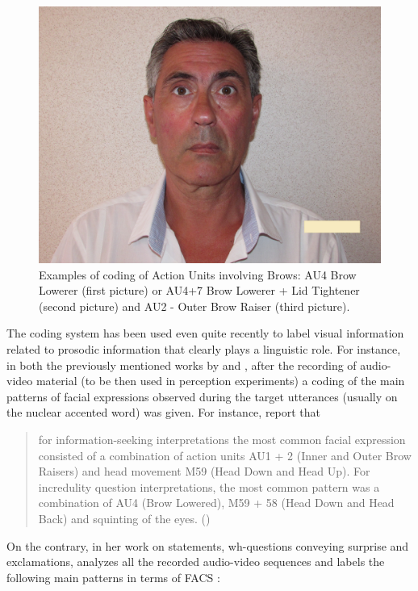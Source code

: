 \documentclass[output=paper]{langsci/langscibook}
\begin{document}
\begin{figure}
\includegraphics[height=.3\textheight]{figures/GIL-img8.jpg}
\caption{Examples of coding of Action Units involving Brows: AU4 \textup{Brow Lowerer} (first picture) or AU4+7 \textup{Brow Lowerer} + \textup{Lid Tightener} (second picture) and AU2 - \textup{Outer Brow Raiser (third picture)}.}
\label{fig:gil:4}
\end{figure} 

The coding system has been used even quite recently to label visual information related to prosodic information that clearly plays a linguistic role. For instance, in both the previously mentioned works by \citet{CrespoSendra2013} and \citet{GiliFivela2015informazionimultimodali}, after the recording of audio-video material (to be then used in perception experiments) a coding of the main patterns of facial expressions observed during the target utterances (usually on the nuclear accented word) was given. For instance, \citet[6]{CrespoSendra2013} report that

\begin{quote}
for information-seeking interpretations the most common facial expression consisted of a combination of action units AU1 + 2 (Inner and Outer Brow Raisers) and head movement M59 (Head Down and Head Up). For incredulity question interpretations, the most common pattern was a combination of AU4 (Brow Lowered), M59 + 58 (Head Down and Head Back) and squinting of the eyes.
(\citealt[6]{CrespoSendra2013})
\end{quote}

On the contrary, in her work on statements, wh-questions conveying surprise and exclamations, \citet{GiliFivela2015informazionimultimodali} analyzes all the recorded audio-video sequences and labels the following main patterns in terms of FACS : 
\end{document}
